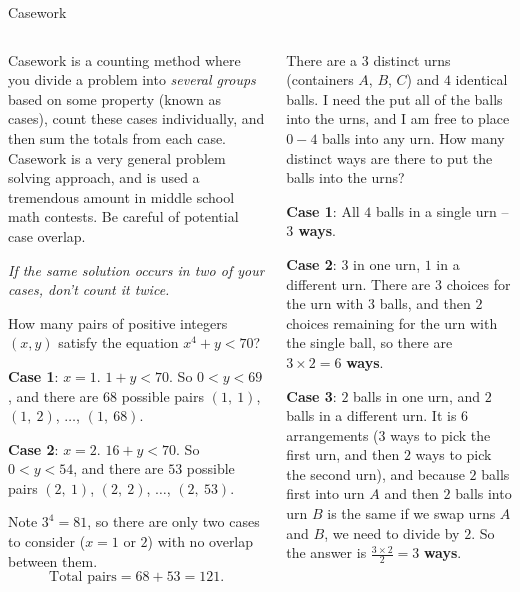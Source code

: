 \documentclass[9pt,aspectratio=169]{beamer}
\begin{document}
\begin{frame}{Casework}
  \begin{columns}[T]
    \begin{column}{0.5\textwidth}
      \begin{definition}
        Casework is a counting method where you divide a problem into \emph{several groups} based on some property (known as cases), count these cases individually, and then sum the totals from each case. Casework is a very general problem solving approach, and is used a tremendous amount in middle school math contests.  Be careful of potential case overlap. 
        
        \emph{If the same solution occurs in two of your cases, don’t count it twice.}
      \end{definition}
      \small
      \begin{problem}
        How many pairs of positive integers $(x, y)$ satisfy the equation $x^4 + y < 70$?
      \end{problem}
      \textbf{Case 1}: $x = 1$.  $1 + y < 70$.  So $0 < y < 69$, and there are $68$ possible pairs $(1,\ 1)$, $(1,\ 2)$, $\ldots$, $(1,\ 68)$.
      
      \textbf{Case 2}: $x = 2$.  $16 + y < 70$.  So $0 < y < 54$, and there are $53$ possible pairs $(2,\ 1)$, $(2,\ 2)$, $\ldots$, $(2,\ 53)$.

      Note $3^4 = 81$, so there are only two cases to consider ($x = 1 \text{ or } 2$) with no overlap between them.
      \[ \text{Total pairs} = 68 + 53 = 121. \]
    \end{column}
    \begin{column}{0.5\textwidth}
      \small
      \begin{problem}
        There are a $3$ distinct urns (containers $A$, $B$, $C$) and $4$ identical balls.  I need the put all of the balls into the urns, and I am free to place $0-4$ balls into any urn.  How many distinct ways are there to put the balls into the urns?
      \end{problem}
      \textbf{Case 1}:  All $4$ balls in a single urn -- \textbf{$3$ ways}.
      
      \textbf{Case 2}: $3$ in one urn, $1$ in a different urn.  There are $3$ choices for the urn with $3$ balls, and then $2$ choices remaining for the urn with the single ball, so there are $3 \times 2 = 6$ \textbf{ways}.
      
      \textbf{Case 3}: $2$ balls in one urn, and $2$ balls in a different urn.  It is $6$ arrangements ($3$ ways to pick the first urn, and then $2$ ways to pick the second urn), and because $2$ balls first into urn $A$ and then $2$ balls into urn $B$ is the same if we swap urns $A$ and $B$, we need to divide by $2$. So the answer is $\frac{3 \times 2}{2} = 3$ \textbf{ways}.
      

\end{column}
\end{columns}
\end{frame}
\end{document}

